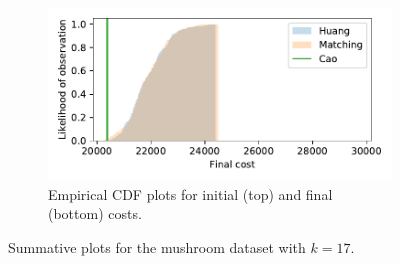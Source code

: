 \documentclass[smallextended]{svjour3}
\begin{document}
\begin{figure}
\begin{subfigure}{.5\textwidth}
        \includegraphics[width=\linewidth]{Fig2b2.pdf}
        \caption{Empirical CDF plots for initial (top) and final (bottom)
                 costs.}
    \end{subfigure}
    \caption{Summative plots for the mushroom dataset with \(k=17\).}%
    \label{fig:mushroom_knee}
\end{figure}
\end{document}

